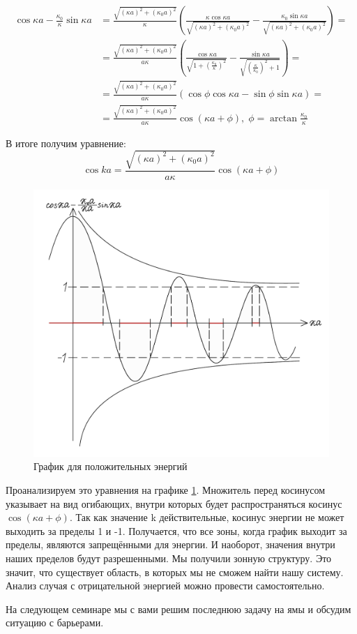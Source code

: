 \begin{align*}
    \cos \kappa a - \frac{\kappa_0}{\kappa} \sin \kappa a & = \frac{\sqrt{(\kappa a)^2 + (\kappa_0 a)^2}}{\kappa}\left( \frac{\kappa \cos \kappa a}{\sqrt{(\kappa a)^2 + (\kappa_0 a)^2}} -  \frac{\kappa_0 \sin \kappa a}{\sqrt{(\kappa a)^2 + (\kappa_0 a)^2}}\right) = \\
    & = \frac{\sqrt{(\kappa a)^2 + (\kappa_0 a)^2}}{a\kappa}\left( \frac{\cos \kappa a}{\sqrt{1 + (\frac{\kappa_0}{\kappa})^2}} -  \frac{\sin \kappa a}{\sqrt{(\frac{\kappa}{\kappa_0})^2 + 1}}\right) = \\
    & = \frac{\sqrt{(\kappa a)^2 + (\kappa_0 a)^2}}{a\kappa}\left( \cos\phi \cos\kappa a -  \sin\phi\sin \kappa a\right) =\\
    & =  \frac{\sqrt{(\kappa a)^2 + (\kappa_0 a)^2}}{a\kappa}\cos (\kappa a + \phi), \; \phi = \arctan \frac{\kappa_0}{\kappa}
\end{align*}

В итоге получим уравнение:
\[
\cos ka = \frac{\sqrt{(\kappa a)^2 + (\kappa_0 a)^2}}{a\kappa}\cos (\kappa a + \phi)
\]

\begin{figure}[!ht]
\centering
\includegraphics[scale=0.23]{class_4/images/pos energy delta.png}
\caption{График для положительных энергий}
\label{fig 4.6}
\end{figure}
Проанализируем это уравнения на графике \ref{fig 4.6}. Множитель перед косинусом указывает на вид огибающих, внутри которых будет распространяться косинус $\cos (\kappa a + \phi)$. Так как значение k действительные, косинус энергии не может выходить за пределы 1 и -1. Получается, что все зоны, когда график выходит за пределы, являются запрещёнными для энергии. И наоборот, значения внутри наших пределов будут разрешенными. Мы получили зонную структуру. Это значит, что существует область, в которых мы не сможем найти нашу систему. Анализ случая с отрицательной энергией можно провести самостоятельно.

На следующем семинаре мы с вами решим последнюю задачу на ямы и обсудим ситуацию с барьерами.